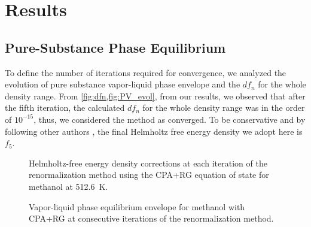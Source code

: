 \documentclass[preprint,12pt,3p]{elsarticle}
\begin{document}
\section{Results}

\subsection{Pure-Substance Phase Equilibrium}
\label{sec:pure-substance phase equilibrium results}

To define the number of iterations required for convergence, we analyzed the evolution of pure substance vapor-liquid phase envelope and the $df_{n}$ for the whole density range.
From \cref{fig:dfn,fig:PV_evol}, from our results, we observed that after the fifth iteration, the calculated $df_{n}$ for the whole density range was in the order of $10^{-15}$, thus, we considered the method as converged.
To be conservative and by following other authors  \cite{llovell2004thermodynamic, cai2004thermodynamics, pcm2017application}, the final Helmholtz free energy density we adopt here is $f_{5}$.

\begin{figure}[h!]
\centering
\captionsetup{justification=centering}
\caption{Helmholtz-free energy density corrections at each iteration of the renormalization method using the CPA+RG equation of state for methanol at 512.6~K.}
\label{fig:dfn}
\end{figure}

\begin{figure}[h!]
\centering
\captionsetup{justification=centering}
\caption{Vapor-liquid phase equilibrium envelope for methanol with CPA+RG at consecutive iterations of the renormalization method.}
\label{fig:PV_evol}
\end{figure}
\end{document}
